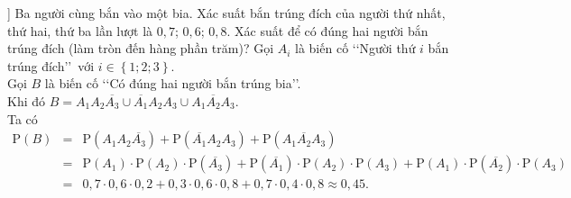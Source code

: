 \begin{bt}%
]%
Ba người cùng bắn vào một bia. Xác suất bắn trúng đích của người thứ nhất, thứ hai, thứ ba lần lượt là $0{,}7$; $0{,}6$; $0{,}8$. Xác suất để có đúng hai người bắn trúng đích (làm tròn đến hàng phần trăm)?
\loigiai
{
Gọi $A_i$ là biến cố \lq\lq Người thứ $i$ bắn trúng đích\rq\rq\, với $i \in \left\{1;2;3\right\}$.\\
Gọi $B$ là biến cố \lq\lq Có đúng hai người bắn trúng bia\rq\rq.\\
Khi đó $B=A_1A_2\overline{A_3}\cup \overline{A_1}A_2A_3\cup A_1\overline{A_2}A_3$.\\
Ta có 
\begin{eqnarray*}
\mathrm{P} \left(B \right) &=& \mathrm{P} \left(A_1A_2\overline{A_3} \right)+\mathrm{P} \left(\overline{A_1}A_2A_3 \right)+\mathrm{P} \left(A_1\overline{A_2}A_3 \right) \\ 
& = & \mathrm{P} \left(A_1 \right) \cdot \mathrm{P} \left(A_2 \right)\cdot \mathrm{P} \left(\overline{A_3} \right)+\mathrm{P} \left(\overline{A_1} \right)\cdot \mathrm{P} \left(A_2 \right)\cdot \mathrm{P} \left(A_3 \right)+\mathrm{P} \left(A_1 \right)\cdot \mathrm{P} \left(\overline{A_2} \right) \cdot \mathrm{P} \left(A_3 \right) \\ 
& = & 0,7 \cdot 0,6 \cdot 0,2+0,3 \cdot 0,6 \cdot 0,8+0,7 \cdot 0,4 \cdot 0,8 \approx 0,45.
\end{eqnarray*}
}
\end{bt}

